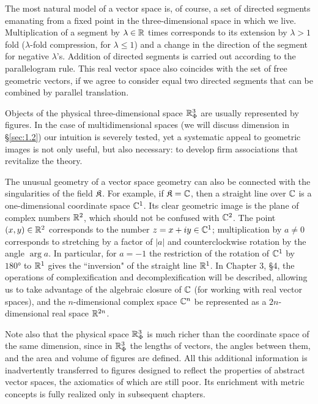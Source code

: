 The most natural model of a vector space is, of course, a set of directed segments emanating from a fixed point in the three-dimensional space in which we live. Multiplication of a segment by $\lambda \in {\mathbb{R}}$ times corresponds to its extension by $\lambda > 1$ fold ($\lambda$-fold compression, for $\lambda\le 1$) and a change in the direction of the segment for negative $\lambda$'s. Addition of directed segments is carried out according to the parallelogram rule. This real vector space also coincides with the set of free geometric vectors, if we agree to consider equal two directed segments that can be combined by parallel translation.

Objects of the physical three-dimensional space ${\mathbb{R}}_\Phi^3$ are usually represented by figures. In the case of multidimensional spaces (we will discuss dimension in \S\ref{sec:1.2}) our intuition is severely tested, yet a systematic appeal to geometric images is not only useful, but also necessary: to develop firm associations that revitalize the theory.

The unusual geometry of a vector space geometry can also be connected with the singularities of the field ${\mathfrak{K}}$. For example, if ${\mathfrak{K}} = {\mathbb{C}}$, then a straight line over ${\mathbb{C}}$ is a one-dimensional coordinate space ${\mathbb{C}}^1$. Its clear geometric image is the plane of complex numbers ${\mathbb{R}}^2$, which should not be confused with ${\mathbb{C}}^2$. The point $(x, y) \in {\mathbb{R}}^2$ corresponds to the number $z = x + iy\in {\mathbb{C}}^1$; multiplication by $a\ne 0$ corresponds to stretching by a factor of $|a|$ and counterclockwise rotation by the angle $\arg a$. In particular, for $a=-1$ the restriction of the rotation of ${\mathbb{C}}^1$ by $\ang{180}$ to ${\mathbb{R}}^1$ gives the ``inversion" of the straight line ${\mathbb{R}}^1$. In Chapter 3, \S4, the operations of complexification and decomplexification will be described, allowing us to take advantage of the algebraic closure of ${\mathbb{C}}$ (for working with real vector spaces), and the $n$-dimensional complex space ${\mathbb{C}}^n$ be represented as a $2n$-dimensional real space ${\mathbb{R}}^{2n}$.

Note also that the physical space ${\mathbb{R}}_\Phi^3$ is much richer than the coordinate space of the same dimension, since in ${\mathbb{R}}_\Phi^3$ the lengths of vectors, the angles between them, and the area and volume of figures are defined. All this additional information is inadvertently transferred to figures designed to reflect the properties of abstract vector spaces, the axiomatics of which are still poor. Its enrichment with metric concepts is fully realized only in subsequent chapters.


